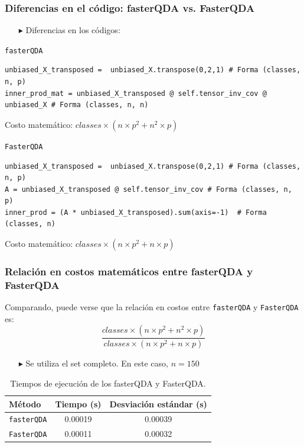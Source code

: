 \documentclass{beamer}
\begin{document}
\begin{frame}[fragile]
  \frametitle{Diferencias en el código: fasterQDA vs. FasterQDA}
  \begin{itemize}
    \item[$\blacktriangleright$] Diferencias en los códigos:
  \end{itemize}

  \begin{block}{\texttt{fasterQDA}}
    \begin{lstlisting}[style=pythonstyle]
unbiased_X_transposed =  unbiased_X.transpose(0,2,1) # Forma (classes, n, p)
inner_prod_mat = unbiased_X_transposed @ self.tensor_inv_cov @ unbiased_X # Forma (classes, n, n)
    \end{lstlisting}
  \end{block}
  Costo matemático: \(classes \times (n \times p^2 + n^2 \times p)\)

  \begin{block}{\texttt{FasterQDA}}
    \begin{lstlisting}[style=pythonstyle]
unbiased_X_transposed =  unbiased_X.transpose(0,2,1) # Forma (classes, n, p)
A = unbiased_X_transposed @ self.tensor_inv_cov # Forma (classes, n, p)
inner_prod = (A * unbiased_X_transposed).sum(axis=-1)  # Forma (classes, n)
    \end{lstlisting}
  \end{block}
  Costo matemático: \(classes \times (n \times p^2 + n \times p)\)

\end{frame}


\begin{frame}[fragile]
    \frametitle{Relación en costos matemáticos entre fasterQDA y FasterQDA}
  Comparando, puede verse que la relación en costos entre \texttt{fasterQDA} y \texttt{FasterQDA} es:
  \[
    \frac{classes \times (n \times p^2 + n^2 \times p)}{classes \times (n \times p^2 + n \times p)}
  \]

  \begin{itemize}
    \item[$\blacktriangleright$] Se utiliza el set completo. En este caso, $n=150$
  \end{itemize}

  \begin{table}[h!]
      \centering
      \begin{tabular}{@{}lcc@{}}
        \toprule
        \textbf{Método}      & Tiempo (s)           & Desviación estándar (s) \\ 
        \midrule
        \texttt{fasterQDA}   & 0.00019              & 0.00039                 \\ 
        \texttt{FasterQDA}   & 0.00011              & 0.00032                 \\ 
        \bottomrule
      \end{tabular}
      \caption{Tiempos de ejecución de los fasterQDA y FasterQDA.}
  \end{table}

\end{frame}
\end{document}
